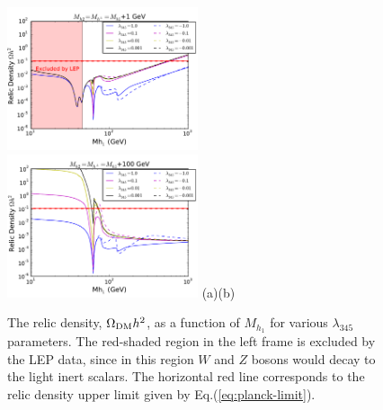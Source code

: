 \documentclass[12pt,a4paper]{article}
\begin{document}
\begin{figure}[htb]
\centering
{\includegraphics[width=0.5\textwidth]{Omega_Mh1_new.pdf}}%
{\includegraphics[width=0.5\textwidth]{Omega_Mh1_mh+100_new.pdf}}%
\vskip -0.5cm\hspace*{-3cm}(a)\hspace*{0.48\textwidth}(b)
\caption{The relic density, $\Omega_{\rm DM} h^2$,   as a function of $M_{h_1}$
for various $\lambda_{345}$ parameters. The red-shaded region in the left frame is excluded by the LEP data, 
since in this region $W$ and $Z$ bosons would decay to the light inert scalars. 
The horizontal red line corresponds to the relic density upper limit given by Eq.(\ref{eq:planck-limit}).}
\label{fig:1d-mh1-Omega}
\end{figure}
%
\end{document}
